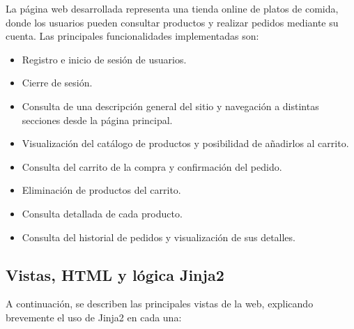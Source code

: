 \documentclass[10pt]{book}
\begin{document}
La página web desarrollada representa una tienda online de platos de comida, donde los usuarios pueden consultar productos y realizar pedidos mediante su cuenta. Las principales funcionalidades implementadas son:

\begin{itemize}
    \item Registro e inicio de sesión de usuarios.
    \item Cierre de sesión.
    \item Consulta de una descripción general del sitio y navegación a distintas secciones desde la página principal.
    \item Visualización del catálogo de productos y posibilidad de añadirlos al carrito.
    \item Consulta del carrito de la compra y confirmación del pedido.
    \item Eliminación de productos del carrito.
    \item Consulta detallada de cada producto.
    \item Consulta del historial de pedidos y visualización de sus detalles.
\end{itemize}
\newpage
\subsection{Vistas, HTML y lógica Jinja2}

A continuación, se describen las principales vistas de la web, explicando brevemente el uso de Jinja2 en cada una:
\end{document}
